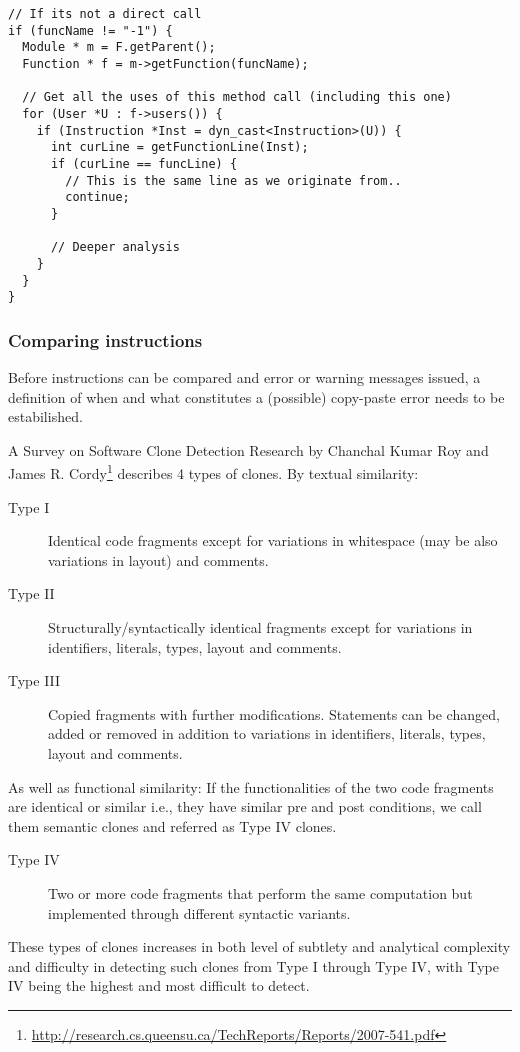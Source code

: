 \documentclass[a4paper,11pt]{article}
\theoremstyle{mytheor}
\begin{document}
\begin{lstlisting}[caption=Finding similar call sites]
// If its not a direct call
if (funcName != "-1") {
  Module * m = F.getParent();
  Function * f = m->getFunction(funcName);

  // Get all the uses of this method call (including this one)
  for (User *U : f->users()) {
    if (Instruction *Inst = dyn_cast<Instruction>(U)) {
      int curLine = getFunctionLine(Inst);
      if (curLine == funcLine) {
        // This is the same line as we originate from..
        continue;
      }

      // Deeper analysis
    }
  }
}
\end{lstlisting}

\subsubsection*{Comparing instructions}
Before instructions can be compared and error or warning messages issued,
a definition of when and what constitutes a (possible) copy-paste error needs to be estabilished.

A Survey on Software Clone Detection Research by Chanchal Kumar Roy and James R. Cordy\footnote{\url{http://research.cs.queensu.ca/TechReports/Reports/2007-541.pdf}} describes 4 types of clones.
By textual similarity:
\begin{description}
\item[Type I] Identical code fragments except for variations in whitespace (may be also variations in layout) and comments.
\item[Type II] Structurally/syntactically identical fragments except for variations in identifiers, literals, types, layout and comments.
\item[Type III] Copied fragments with further modifications. Statements can be changed, added or removed in addition to variations in identifiers, literals, types, layout and comments.
\end{description}
As well as functional similarity:  If the functionalities of the two code fragments are identical or
similar i.e., they have similar pre and post conditions, we call them semantic clones and referred as Type IV clones.
\begin{description}
\item[Type IV] Two or more code fragments that perform the same computation but implemented through different syntactic variants.
\end{description}
These types of clones increases in both level of subtlety and analytical complexity and difficulty in detecting such clones from Type I through Type IV, with Type IV being the highest and most difficult to detect.
\end{document}
